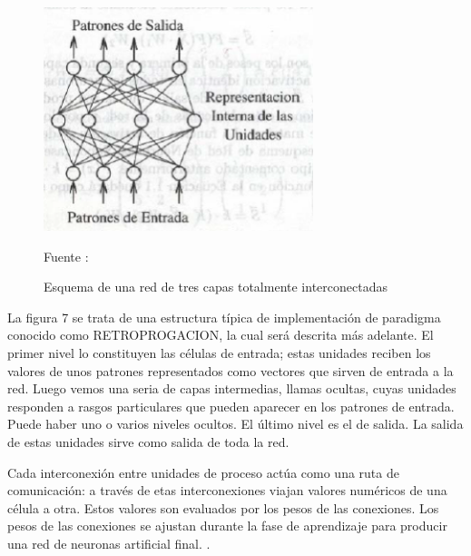 \documentclass[a4paper, 12pt]{article}
\begin{document}
\begin{enumerate}
\begin{figure}[ht]
\begin{center}
\includegraphics[width=0.7\textwidth]{estructurabasica}
\end{center}
\begin{center}
\caption{\small{Esquema de una red de tres capas totalmente interconectadas}}
{\small{Fuente : \cite{Isasi}}}
\end{center}
\end{figure}

La figura 7 se trata de una estructura típica de implementación de paradigma conocido como RETROPROGACION, la cual será descrita más adelante. El primer nivel lo constituyen las células de entrada; estas unidades reciben los valores de unos patrones representados como vectores que sirven de entrada a la red. Luego vemos una seria de capas intermedias, llamas ocultas, cuyas unidades responden a rasgos particulares que pueden aparecer en los patrones de entrada. Puede haber uno o varios niveles ocultos. El último nivel es el de salida. La salida de estas unidades sirve como salida de toda la red.\par
Cada interconexión entre unidades de proceso actúa como una ruta de comunicación: a través de etas interconexiones viajan valores numéricos de una célula a otra. Estos valores son evaluados por los pesos de las conexiones. Los pesos de las conexiones se ajustan durante la fase de aprendizaje para producir una red de neuronas artificial final. \citep{Isasi}.\par

\vskip 0.3cm


\end{enumerate}
\end{document}
